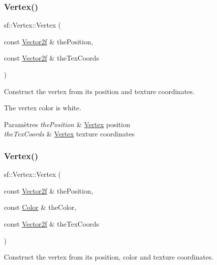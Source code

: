 \subsubsection{\texorpdfstring{Vertex()}{Vertex()}\hspace{0.1cm}{\footnotesize\ttfamily [3/4]}}
{\footnotesize\ttfamily sf\+::\+Vertex\+::\+Vertex (\begin{DoxyParamCaption}\item[{const \hyperlink{classsf_1_1Vector2}{Vector2f} \&}]{the\+Position,  }\item[{const \hyperlink{classsf_1_1Vector2}{Vector2f} \&}]{the\+Tex\+Coords }\end{DoxyParamCaption})}



Construct the vertex from its position and texture coordinates. 

The vertex color is white.


\begin{DoxyParams}{Paramètres}
{\em the\+Position} & \hyperlink{classsf_1_1Vertex}{Vertex} position \\
\hline
{\em the\+Tex\+Coords} & \hyperlink{classsf_1_1Vertex}{Vertex} texture coordinates \\
\hline
\end{DoxyParams}
\mbox{\label{classsf_1_1Vertex_ad5943f2b3cbc64b6e714bb37ccaf4960}} 
\subsubsection{\texorpdfstring{Vertex()}{Vertex()}\hspace{0.1cm}{\footnotesize\ttfamily [4/4]}}
{\footnotesize\ttfamily sf\+::\+Vertex\+::\+Vertex (\begin{DoxyParamCaption}\item[{const \hyperlink{classsf_1_1Vector2}{Vector2f} \&}]{the\+Position,  }\item[{const \hyperlink{classsf_1_1Color}{Color} \&}]{the\+Color,  }\item[{const \hyperlink{classsf_1_1Vector2}{Vector2f} \&}]{the\+Tex\+Coords }\end{DoxyParamCaption})}



Construct the vertex from its position, color and texture coordinates. 


